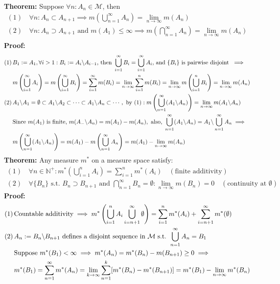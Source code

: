 \documentclass{article}
\newcommand{\N}{\mathbb{N}}
\newcommand{\sumiinf}{\displaystyle\sum_{i=1}^\infty}
\newcommand{\sumninf}{\displaystyle\sum_{n=1}^\infty}
\newcommand{\infcap}{\displaystyle\bigcap_{n=1}^\infty}
\newcommand{\capninf}{\displaystyle\bigcap_{n=1}^\infty}
\newcommand{\infcup}{\displaystyle\bigcup_{n=1}^\infty}
\newcommand{\cupiinf}{\displaystyle\bigcup_{i=1}^\infty}
\newcommand{\cupninf}{\displaystyle\bigcup_{n=1}^\infty}
\newcommand{\sumin}{\displaystyle\sum_{i=1}^n}
\newcommand{\cupin}{\displaystyle\bigcup_{i=1}^n}
\newcommand{\bcsl}{\symbol{92}}
\newcommand{\limninf}{\displaystyle\lim_{n\to\infty}}
\newcommand{\limkinf}{\displaystyle\lim_{k\to\infty}}
\newcommand{\st}{\mbox{ s.t. }}
\newcommand{\0}{{\bf{0}}}
\newcommand{\1}{{\bf{1}}}
\begin{document}
\textbf{Theorem:} Suppose $\forall n:A_n\in\mathcal{M}$, then
\begin{equation}
\begin{split}
    (1)\,&\forall n:A_n\subset A_{n+1}\implies m\left(\infcup A_n\right)=\limninf m(A_n)\\
    (2)\,&\forall n:A_n\supset A_{n+1}\mbox{ and }m(A_1)\le\infty\implies m\left(\infcap A_n\right)=\limninf m(A_n)\\
\end{split}
\end{equation}
\textbf{Proof:}
\begin{equation}
\begin{split}
    (1)\,&B_1:=A_1,\forall i>1:B_i:=A_i\symbol{92}A_{i-1}\mbox{, then }\bigcup_{i=1}^\infty B_i=\bigcup_{i=1}^\infty A_i\mbox{, and }\{B_i\}\mbox{ is pairwise disjoint }\implies\\
    &m\left(\cupiinf A_i\right)=m\left(\cupiinf B_i\right)=\sumiinf m(B_i)=\limninf\sumin m(B_i)=\limninf m\left(\cupin B_i\right)=\limninf m(A_n)\\
    (2)\,&A_1\bcsl A_1=\emptyset\subset A_1\bcsl A_2\subset\dots\subset A_1\bcsl A_n\subset\cdots,\mbox{ by (1)}:m\left(\cupninf(A_1\bcsl A_n)\right)=\limninf m(A_1\bcsl A_n)\\
    &\mbox{Since }m(A_1)\mbox{ is finite, }m(A_-\bcsl A_n)=m(A_1)-m(A_n),\mbox{ also, }\cupninf(A_1\bcsl A_n)=A_1\bcsl\cupninf A_n\implies\\
    &m\left(\infcup (A_1\bcsl A_n)\right)=m(A_1)-m\left(\infcup A_n\right)=m(A_1)-\limninf m(A_n)
\end{split}
\end{equation}
\textbf{Theorem:} Any measure $m^*$ on a measure space satisfy:
\begin{equation}
\begin{split}
    (1)\,&\forall n\in\N^+:m^*\left(\cupin A_i\right)=\sumin m^*(A_i)\quad(\mbox{finite additivity})\\
    (2)\,&\forall\{B_n\}\st B_n\supset B_{n+1}\mbox{ and }\capninf B_n=\emptyset:\limninf m(B_n)=0\quad(\mbox{continuity at }\emptyset)
\end{split}
\end{equation}
\textbf{Proof:}
\begin{equation}
\begin{split}
    (1)\,&\mbox{Countable additivity}\implies m^*\left(\cupin A_i\bigcup_{i=n+1}^\infty\emptyset\right)=\sumin m^*(A_i)+\sum_{i=n+1}^\infty m^*(\emptyset)\\
    (2)\,&A_n:=B_n\bcsl B_{n+1}\mbox{ defines a disjoint sequence in }\mathcal{M}\st\cupninf A_n=B_1\\
    &\mbox{Suppose }m^*(B_1)<\infty\implies m^*(A_n)=m^*(B_n)-m(B_{n+1})\geq0\implies\\
    &m^*(B_1)=\sumninf m^*(A_n)=\limkinf\sum_{n=1}^k[m^*(B_n)-m^*(B_{n+1})]=m^*(B_1)-\limninf m^*(B_n)
\end{split}
\end{equation}
\end{document}
